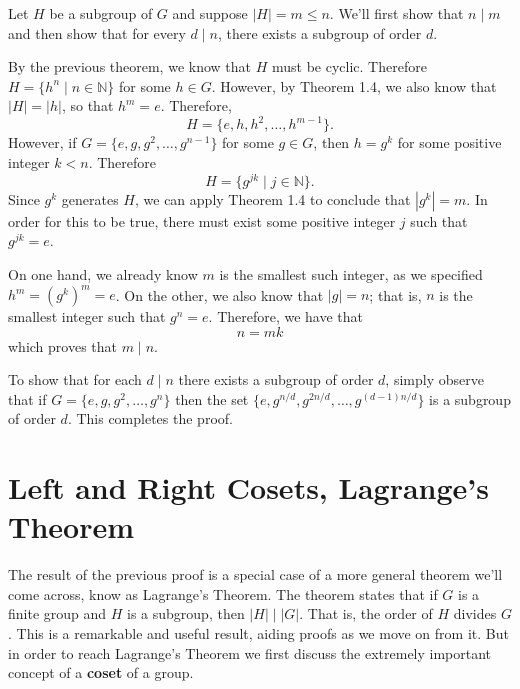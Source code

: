 \documentclass[12pt,letterpaper]{algebra_book}
\theoremstyle{definition}
\begin{document}
    \begin{prf}
        Let $H$ be a subgroup of $G$ and suppose
        $|H| = m \le n$. We'll first show that $n \mid m$ and then
        show that for every $d \mid n$, there exists a subgroup of
        order $d$.

        By the previous theorem, we
        know that $H$ must be cyclic. Therefore $H = \{h^n \mid n \in
        \mathbb{N}\}$ for some $h \in G$. However, by Theorem 1.4, we
        also know that $|H| = |h|$, so that $h^m = e$. Therefore, 
        \[
            H = \{e, h, h^2, \dots, h^{m-1}\}.
        \] 
        However, if $G = \{e, g, g^2, \dots, g^{n-1}\}$ for some $g \in G$, then $h = g^k$ for some
        positive integer
        $k < n$. Therefore 
        \[
            H = \{g^{jk} \mid j \in \mathbb{N}\}.
        \]
        Since $g^k$ generates $H$, we can apply Theorem 1.4 to
        conclude that $|g^k| = m$. In order for this to be true, there must
        exist some positive integer $j$ such that $g^{jk} = e$.

        On one hand, we already know $m$ is the smallest such integer, as
        we specified $h^m = (g^k)^m = e$. On the other, we also know
        that $|g| = n$; that is, $n$ is the smallest integer such that
        $g^n = e$. Therefore, we have that 
        \[
            n = mk
        \]
        which proves that $m \mid n$. 

        To show that for each $d \mid n$ there exists a subgroup of
        order $d$, simply observe that if $G = \{e, g, g^2, \dots ,
        g^n\}$ then the set $\{e, g^{n/d}, g^{2n/d}, \dots,
        g^{(d-1)n/d}\}$ is a subgroup of order $d$. This completes the
        proof.
    \end{prf}

    \newpage
    \section{Left and Right Cosets, Lagrange's Theorem}

    The result of the previous proof is a special case of a more general
    theorem we'll come across, know as Lagrange's Theorem. The theorem
    states that if $G$ is a finite group and $H$ is a subgroup, then
    $|H| \mid |G|$. That is, the order of $H$ divides $G$. This is a
    remarkable and useful result, aiding proofs as we move on from it.
    But in order to reach Lagrange's Theorem we first discuss the
    extremely important concept of a \textbf{coset} of a group.
\end{document}
